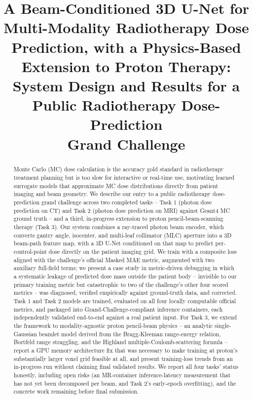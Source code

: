 \documentclass[10pt,conference]{IEEEtran}
\begin{document}
\title{A Beam-Conditioned 3D U-Net for Multi-Modality Radiotherapy Dose\\
Prediction, with a Physics-Based Extension to Proton Therapy:\\
System Design and Results for a Public Radiotherapy Dose-Prediction\\
Grand Challenge}

\author{
}

\maketitle

\begin{abstract}
Monte Carlo (MC) dose calculation is the accuracy gold standard in
radiotherapy treatment planning but is too slow for interactive or
real-time use, motivating learned surrogate models that approximate MC
dose distributions directly from patient imaging and beam geometry. We
describe our entry to a public radiotherapy dose-prediction grand
challenge across two
completed tasks -- Task 1 (photon dose prediction on CT) and Task 2
(photon dose prediction on MRI) against Geant4 MC ground truth -- and a
third, in-progress extension to proton pencil-beam-scanning therapy
(Task 3). Our system combines a ray-traced photon beam encoder, which
converts gantry angle, isocenter, and multi-leaf collimator (MLC)
aperture into a 3D beam-path feature map, with a 3D U-Net conditioned on
that map to predict per-control-point dose directly on the patient
imaging grid. We train with a composite loss aligned with the
challenge's official Masked MAE metric, augmented with two auxiliary
full-field terms; we present a case study in metric-driven debugging in
which a systematic leakage of predicted dose mass outside the patient
body -- invisible to our primary training metric but catastrophic to two
of the challenge's other four scored metrics -- was diagnosed, verified
empirically against ground-truth data, and corrected. Task 1 and Task 2
models are trained, evaluated on all four locally computable official
metrics, and packaged into Grand-Challenge-compliant inference
containers, each independently validated end-to-end against a real
patient input. For Task 3, we extend the framework to modality-agnostic
proton pencil-beam physics -- an analytic single-Gaussian beamlet model
derived from the Bragg-Kleeman range-energy relation, Bortfeld range
straggling, and the Highland multiple-Coulomb-scattering formula --
report a GPU memory architecture fix that was necessary to make training
at proton's substantially larger voxel grid feasible at all, and present
training-loss trends from an in-progress run without claiming final
validated results. We report all four tasks' status honestly, including
open risks (an MR-container inference-latency measurement that has not
yet been decomposed per beam, and Task 2's early-epoch overfitting), and
the concrete work remaining before final submission.
\end{abstract}
\end{document}
